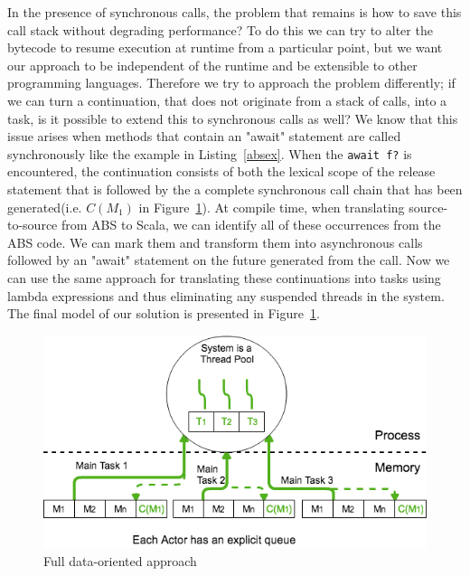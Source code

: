 In the presence of synchronous calls, the problem that remains is how to save this call stack without degrading performance? To do this we can try to alter the bytecode to resume execution at runtime from a particular point, but we want our approach to be independent of the runtime and be extensible to other programming languages. Therefore we try to approach the problem differently; if we can turn a continuation, that does not originate from a stack of calls, into a task, is it possible to extend this to synchronous calls as well? We know that this issue arises when methods that contain an "await" statement are called synchronously like the example in Listing~\ref{absex}. When the \texttt{await f?} is encountered,  the continuation consists of both the lexical scope of the release statement that is followed by the a complete synchronous call chain that has been generated(i.e. $C(M_1)$ in Figure~\ref{sol}). At compile time, when translating source-to-source from ABS to Scala, we can identify all of these occurrences from the ABS code. We can mark them and transform them into asynchronous calls followed by an "await" statement on the future generated from the call. Now we can use the same approach for translating these continuations into tasks using lambda expressions and thus eliminating any suspended threads in the system.  The final model of our solution is presented in Figure~\ref{sol}. 
\begin{figure}
	\centering
	\includegraphics[scale=0.47]{solution.png}
	\caption{Full data-oriented approach}
	\label{sol}
\end{figure}


